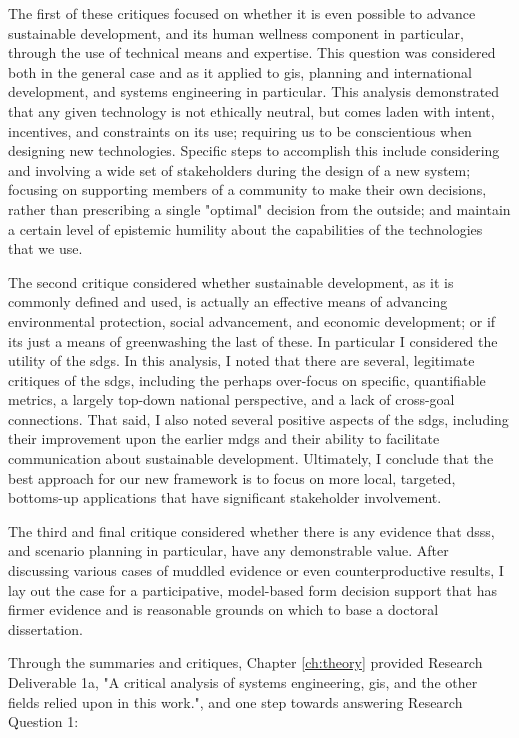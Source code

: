 The first of these critiques focused on whether it is even possible to advance sustainable development, and its human wellness component in particular, through the use of technical means and expertise. This question was considered both in the general case and as it applied to \ac{gis}, planning and international development, and systems engineering in particular. This analysis demonstrated that any given technology is not ethically neutral, but comes laden with intent, incentives, and constraints on its use; requiring us to be conscientious when designing new technologies. Specific steps to accomplish this include considering and involving a wide set of stakeholders during the design of a new system; focusing on supporting members of a community to make their own decisions, rather than prescribing a single "optimal" decision from the outside; and maintain a certain level of epistemic humility about the capabilities of the technologies that we use.

The second critique considered whether sustainable development, as it is commonly defined and used, is actually an effective means of advancing environmental protection, social advancement, and economic development; or if its just a means of greenwashing the last of these. In particular I considered the utility of the \acfp{sdg}. In this analysis, I noted that there are several, legitimate critiques of the \acp{sdg}, including the perhaps over-focus on specific, quantifiable metrics, a largely top-down national perspective, and a lack of cross-goal connections. That said, I also noted several positive aspects of the \acp{sdg}, including their improvement upon the earlier \acfp{mdg} and their ability to facilitate communication about sustainable development. Ultimately, I conclude that the best approach for our new framework is to focus on more local, targeted, bottoms-up applications that have significant stakeholder involvement.

The third and final critique considered whether there is any evidence that \acp{dss}, and scenario planning in particular, have any demonstrable value. After discussing various cases of muddled evidence or even counterproductive results, I lay out the case for a participative, model-based form decision support that has firmer evidence and is reasonable grounds on which to base a doctoral dissertation.

Through the summaries and critiques, Chapter \ref{ch:theory} provided Research Deliverable 1a, "A critical analysis of systems engineering, \ac{gis}, and the other fields relied upon in this work.", and one step towards answering Research Question 1:

